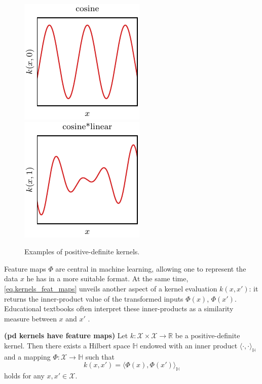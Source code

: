 \begin{figure}[t]
	\includegraphics{../images/chap2_kernel_cs.pdf} \hspace{3pt}
	\includegraphics{../images/chap2_kernel_csli.pdf} 
	\caption{Examples of positive-definite kernels.}
	\label{fig.pd_kernels}
\end{figure}


Feature maps $\Phi$ are central in machine learning, allowing one to represent the data $x$ he has in a more suitable format. At the same time, \eqref{eq.kernels_feat_maps} unveils another aspect of a kernel evaluation $k(x,x')$: it returns the inner-product value of the transformed inputs $\Phi(x)$, $\Phi(x')$. Educational textbooks often interpret these inner-products as a similarity measure between $x$ and $x'$ \citep{scholkopf2002learning}.

\begin{proposition}
	\label{thm.pd_kernels_feature_maps}
	\textbf{(\ac{pd} kernels have feature maps)} 
	Let $k:\mathcal{X} \times \mathcal{X} \rightarrow \mathbb{R} $ be a positive-definite kernel. Then there exists a Hilbert space $\mathbb{H}$ endowed with an inner product $\langle \cdot,\cdot \rangle_\mathbb{H}$ and a mapping $\Phi :  \mathcal{X} \rightarrow \mathbb{H}$ such that 
	\begin{equation}
		\label{eq.kernels_feat_maps}
		k(x,x') = \langle \Phi(x),\Phi(x') \rangle_\mathbb{H}
	\end{equation}
	holds for any $x,x' \in \mathcal{X}$.
\end{proposition}

